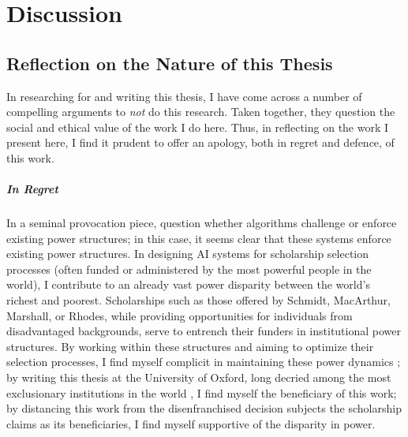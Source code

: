 

\chapter{\label{ch:discussion}Discussion}

\minitoc

\section{Reflection on the Nature of this Thesis}
In researching for and writing this thesis, I have come across a number of compelling arguments to \emph{not} do this research. Taken together, they question the social and ethical value of the work I do here. Thus, in reflecting on the work I present here, I find it prudent to offer an apology, both in regret and defence, of this work.

\paragraph{In Regret}
In a seminal provocation piece, \textcite{Barocas_Hood_Ziewitz_2013} question whether algorithms challenge or enforce existing power structures; in this case, it seems clear that these systems enforce existing power structures. In designing AI systems for scholarship selection processes (often funded or administered by the most powerful people in the world), I contribute to an already vast power disparity between the world's richest and poorest. Scholarships such as those offered by Schmidt, MacArthur, Marshall, or Rhodes, while providing opportunities for individuals from disadvantaged backgrounds, serve to entrench their funders in institutional power structures. By working within these structures and aiming to optimize their selection processes, I find myself complicit in maintaining these power dynamics \cite{Ziegler_2008}; by writing this thesis at the University of Oxford, long decried among the most exclusionary institutions in the world \cite{Ziegler_2008}, I find myself the beneficiary of this work; by distancing this work from the disenfranchised decision subjects the scholarship claims as its beneficiaries, I find myself supportive of the disparity in power. 

